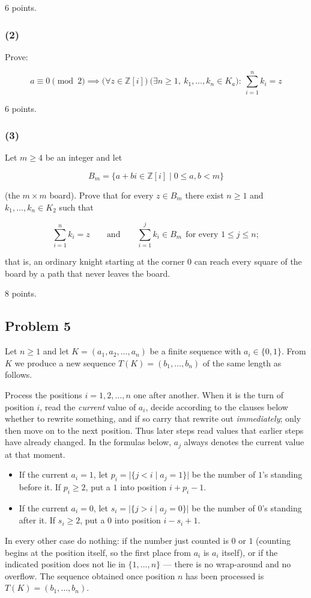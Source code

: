 \documentclass[11pt,a4paper]{article}
\begin{document}
6 points.

\subsubsection{(2)}
Prove:

$$a \equiv 0 \pmod{2}\implies
\bigl(\forall z\in\mathbb{Z}[i]\bigr)\ \bigl(\exists n\ge 1,\ 
k_1,\ldots,k_n\in K_a\bigr):\ \sum_{i=1}^n k_i=z$$

6 points.

\subsubsection{(3)}
Let $m\ge 4$ be an integer and let

$$B_m=\{a+bi\in\mathbb{Z}[i]\mid 0\le a,b<m\}$$

(the $m\times m$ board). Prove that for every $z\in B_m$ there exist
$n\ge 1$ and $k_1,\ldots,k_n\in K_2$ such that

$$\sum_{i=1}^n k_i=z\qquad\text{and}\qquad
\sum_{i=1}^j k_i\in B_m\ \ \text{for every } 1\le j\le n ;$$

that is, an ordinary knight starting at the corner $0$ can reach every
square of the board by a path that never leaves the board.

8 points.

\subsection{Problem 5}

Let $n\ge 1$ and let $K=(a_1,a_2,\ldots ,a_n)$ be a finite sequence with
$a_i\in\{0,1\}$. From $K$ we produce a new sequence
$T(K)=(b_1,\ldots ,b_n)$ of the same length as follows.

Process the positions $i=1,2,\ldots ,n$ one after another. When it is the
turn of position $i$, read the \emph{current} value of $a_i$, decide
according to the clauses below whether to rewrite something, and if so carry
that rewrite out \emph{immediately}; only then move on to the next position.
Thus later steps read values that earlier steps have already changed. In the
formulas below, $a_j$ always denotes the current value at that moment.
\begin{itemize}
\item If the current $a_i=1$, let
$p_i=\bigl|\{j<i\mid a_j=1\}\bigr|$ be the number of $1$'s standing before
it. If $p_i\ge 2$, put a $1$ into position $i+p_i-1$.
\item If the current $a_i=0$, let
$s_i=\bigl|\{j>i\mid a_j=0\}\bigr|$ be the number of $0$'s standing after
it. If $s_i\ge 2$, put a $0$ into position $i-s_i+1$.
\end{itemize}
In every other case do nothing: if the number just counted is $0$ or $1$
(counting begins at the position itself, so the first place from $a_i$ is
$a_i$ itself), or if the indicated position does not lie in
$\{1,\ldots ,n\}$ --- there is no wrap-around and no overflow. The sequence
obtained once position $n$ has been processed is
$T(K)=(b_1,\ldots ,b_n)$.
\end{document}
